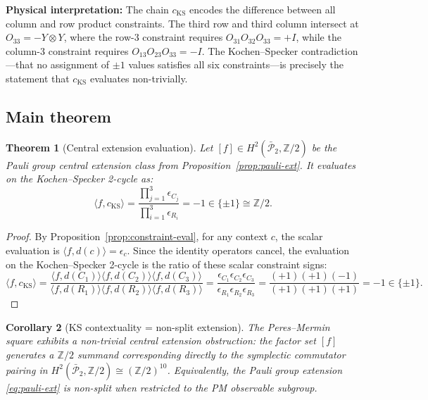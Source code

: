 \documentclass[11pt]{article}
\newtheorem{theorem}{Theorem}[section]
\newtheorem{corollary}[theorem]{Corollary}
\begin{document}
\textbf{Physical interpretation:} The chain $c_{\mathrm{KS}}$ encodes the difference between all column and row product constraints. The third row and third column intersect at $O_{33} = -Y \otimes Y$, where the row-3 constraint requires $O_{31} O_{32} O_{33} = +I$, while the column-3 constraint requires $O_{13} O_{23} O_{33} = -I$. The Kochen--Specker contradiction---that no assignment of $\pm 1$ values satisfies all six constraints---is precisely the statement that $c_{\mathrm{KS}}$ evaluates non-trivially.

\subsection{Main theorem}

\begin{theorem}[Central extension evaluation]
\label{thm:central}
Let $[f] \in H^2(\bar{\mathcal{P}}_2, \mathbb{Z}/2)$ be the Pauli group central extension class from Proposition~\ref{prop:pauli-ext}. It evaluates on the Kochen--Specker 2-cycle as:
\begin{equation}
\label{eq:main-eval}
\langle f, c_{\mathrm{KS}} \rangle
= \frac{\prod_{j=1}^3 \epsilon_{C_j}}{\prod_{i=1}^3 \epsilon_{R_i}}
= -1 \in \{\pm 1\} \cong \mathbb{Z}/2.
\end{equation}
\end{theorem}

\begin{proof}
By Proposition~\ref{prop:constraint-eval}, for any context $c$, the scalar evaluation is $\langle f, d(c) \rangle = \epsilon_c$.
Since the identity operators cancel, the evaluation on the Kochen--Specker 2-cycle is the ratio of these scalar constraint signs:
\[
\langle f, c_{\mathrm{KS}} \rangle
= \frac{\langle f, d(C_1) \rangle \langle f, d(C_2) \rangle \langle f, d(C_3) \rangle}{\langle f, d(R_1) \rangle \langle f, d(R_2) \rangle \langle f, d(R_3) \rangle}
= \frac{\epsilon_{C_1} \epsilon_{C_2} \epsilon_{C_3}}{\epsilon_{R_1} \epsilon_{R_2} \epsilon_{R_3}}
= \frac{(+1)(+1)(-1)}{(+1)(+1)(+1)} = -1 \in \{\pm 1\}.
\]
\end{proof}

\begin{corollary}[KS contextuality = non-split extension]
\label{cor:ks-central}
The Peres--Mermin square exhibits a non-trivial central extension
obstruction: the factor set $[f]$ generates a $\mathbb{Z}/2$ summand
corresponding directly to the symplectic commutator pairing in
$H^2(\bar{\mathcal{P}}_2, \mathbb{Z}/2) \cong (\mathbb{Z}/2)^{10}$.
Equivalently, the Pauli group extension \eqref{eq:pauli-ext} is
\emph{non-split} when restricted to the PM observable subgroup.
\end{corollary}
\end{document}
